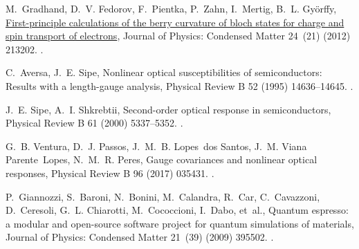 \documentclass[a4paper,12pt]{report}
\begin{document}
\begin{thebibliography}{00}

M.~Gradhand, D.~V. Fedorov, F.~Pientka, P.~Zahn, I.~Mertig, B.~L. Györffy,
  \href{https://dx.doi.org/10.1088/0953-8984/24/21/213202}{First-principle
  calculations of the berry curvature of bloch states for charge and spin
  transport of electrons}, Journal of Physics: Condensed Matter 24~(21) (2012)
  213202.
\newblock \href {https://doi.org/10.1088/0953-8984/24/21/213202}
  {}.


C.~Aversa, J.~E. Sipe, Nonlinear optical susceptibilities of semiconductors:
  Results with a length-gauge analysis, Physical Review B 52 (1995)
  14636--14645.
\newblock \href {https://doi.org/10.1103/PhysRevB.52.14636}
  {}.

J.~E. Sipe, A.~I. Shkrebtii, Second-order optical response in semiconductors,
  Physical Review B 61 (2000) 5337--5352.
\newblock \href {https://doi.org/10.1103/PhysRevB.61.5337}
  {}.

G.~B. Ventura, D.~J. Passos, J.~M.~B. Lopes~dos Santos, J.~M. Viana
  Parente~Lopes, N.~M.~R. Peres, Gauge covariances and nonlinear optical
  responses, Physical Review B 96 (2017) 035431.
\newblock \href {https://doi.org/10.1103/PhysRevB.96.035431}
  {}.

P.~Giannozzi, S.~Baroni, N.~Bonini, M.~Calandra, R.~Car, C.~Cavazzoni,
  D.~Ceresoli, G.~L. Chiarotti, M.~Cococcioni, I.~Dabo, et~al., Quantum
  espresso: a modular and open-source software project for quantum simulations
  of materials, Journal of Physics: Condensed Matter 21~(39) (2009) 395502.
\newblock \href {https://doi.org/10.1088/0953-8984/21/39/395502}
  {}.


\end{thebibliography}
\end{document}
